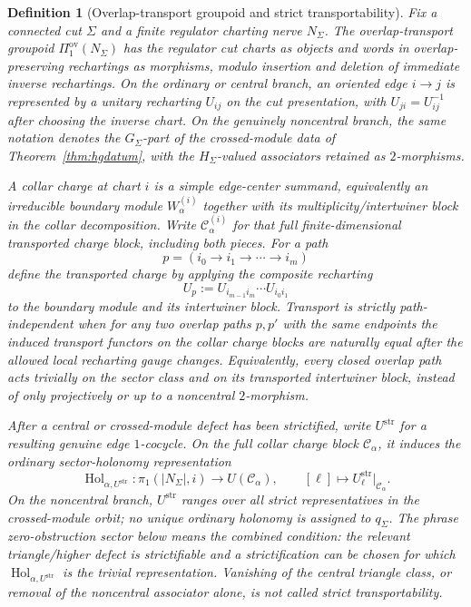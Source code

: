 \documentclass[11pt]{article}
\newtheorem{definition}[theorem]{Definition}
\begin{document}
\begin{definition}[Overlap-transport groupoid and strict transportability]\label{def:overlap-transport}
Fix a connected cut \(\Sigma\) and a finite regulator charting nerve \(N_\Sigma\). The
\emph{overlap-transport groupoid} \(\Pi_1^{\mathrm{ov}}(N_\Sigma)\) has the regulator cut
charts as objects and words in overlap-preserving rechartings as morphisms, modulo insertion and
deletion of immediate inverse rechartings. On the ordinary or central branch, an oriented edge
\(i\to j\) is represented by a unitary recharting \(U_{ij}\) on the cut presentation, with
\(U_{ji}=U_{ij}^{-1}\) after choosing the inverse chart. On the genuinely noncentral branch,
the same notation denotes the \(G_\Sigma\)-part of the crossed-module data of
Theorem~\ref{thm:hgdatum}, with the \(H_\Sigma\)-valued associators retained as \(2\)-morphisms.

A collar charge at chart \(i\) is a simple edge-center summand, equivalently an irreducible
boundary module \(W_\alpha^{(i)}\) together with its multiplicity/intertwiner block in the
collar decomposition. Write \(\mathcal C_\alpha^{(i)}\) for that full finite-dimensional transported
charge block, including both pieces. For a path
\[
p=(i_0\to i_1\to\cdots\to i_m)
\]
define the transported charge by applying the composite recharting
\[
U_p:=U_{i_{m-1}i_m}\cdots U_{i_0i_1}
\]
to the boundary module and its intertwiner block. Transport is \emph{strictly path-independent}
when for any two overlap paths \(p,p'\) with the same endpoints the induced transport functors
on the collar charge blocks are naturally equal after the allowed local recharting gauge changes.
Equivalently, every closed overlap path acts trivially on the sector class and on its transported
intertwiner block, instead of only projectively or up to a noncentral \(2\)-morphism.

After a central or crossed-module defect has been strictified, write \(U^{\mathrm{str}}\) for a
resulting genuine edge \(1\)-cocycle. On the full collar charge block \(\mathcal C_\alpha\), it induces the ordinary
sector-holonomy representation
\[
\operatorname{Hol}_{\alpha,U^{\mathrm{str}}}:\pi_1(|N_\Sigma|,i)
\longrightarrow U(\mathcal C_\alpha),
\qquad
[\ell]\longmapsto U^{\mathrm{str}}_\ell\big|_{\mathcal C_\alpha}.
\]
On the noncentral branch, \(U^{\mathrm{str}}\) ranges over all strict representatives in the
crossed-module orbit; no unique ordinary holonomy is assigned to \(q_\Sigma\).
The phrase \emph{zero-obstruction sector} below means the combined condition: the relevant
triangle/higher defect is strictifiable and a strictification can be chosen for which
\(\operatorname{Hol}_{\alpha,U^{\mathrm{str}}}\) is the trivial representation. Vanishing of the
central triangle class, or removal of the noncentral associator alone, is not called strict
transportability.
\end{definition}
\end{document}

